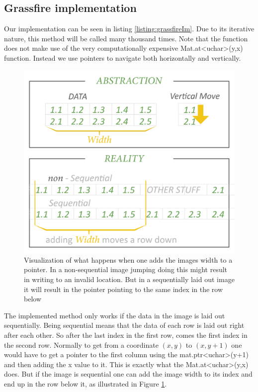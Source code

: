 \subsection{Grassfire implementation}
Our implementation can be seen in listing \ref{listing:grassfireIm}. Due to its iterative nature, this method will be called many thousand times. Note that the function does not make use of the very computationally expensive Mat.at<uchar>(y,x) function. Instead we use pointers to navigate both horizontally and vertically.
\begin{figure}[H]
	\centering
	\includegraphics[width=0.6\linewidth]{figure/Analysis/data.png}
	\caption{Visualization of what happens when one adds the images width to a pointer. In a non-sequential image jumping doing this might result in writing to an invalid location. But in a sequentially laid out image it will result in the pointer pointing to the same index in the row below } 
	\label{fig:vis}
\end{figure}
 The implemented method only works if the data in the image is laid out sequentially. Being sequential means that the data of each row is laid out right after each other. So after the last index in the first row, comes the first index in the second row. Normally to get from a coordinate $(x,y)$ to $(x,y+1)$ one would have to get a pointer to the first column using the mat.ptr<uchar>(y+1) and then adding the x value to it. This is exactly what the Mat.at<uchar>(y,x) does. But if the image is sequential one can add the image width to its index and end up in the row below it, as illustrated in Figure \ref{fig:vis}.\\\\
 

